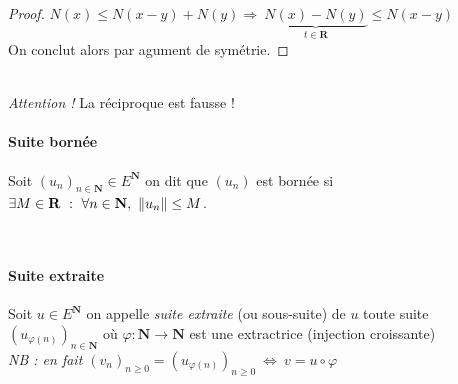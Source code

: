 		 \medskip \\


		\begin{proof}
			$N(x)\leq N(x-y) + N(y) \Rightarrow ~ \underbrace{N(x) - N(y)}_{t\in \mathbf{R}} \leq N(x-y)$\\
			On conclut alors par agument de symétrie.
		\end{proof} \medskip

			
		 \medskip \\ {\small \emph{Attention !} La réciproque est fausse !}

		\vspace{-15pt}
		\traitd
		\paragraph{Suite bornée}
			Soit $\left(u_n\right)_{n\in\mathbf{N}} \in E^{\mathbf{N}}$ on dit que $\left(u_n\right)$ est bornée si
			$\exists M \in \mathbf{R} ~:~ \forall n\in\mathbf{N} ,~\left\Vert u_n \right\Vert\leq M$. 
		\trait

		 \medskip \\

		
		\newpage
		
		\traitd
		\paragraph{Suite extraite}
			Soit $u \in E^{\mathbf{N}}$ on appelle \emph{suite extraite} (ou sous-suite) de $u$ toute suite
			$\left(u_{\varphi (n)}\right)_{n\in \mathbf{N}}$ où $\varphi : \mathbf{N} \rightarrow \mathbf{N}$ 
			est une extractrice (injection croissante) \\ \textit{\small NB : en fait $\left(v_n\right)_{n\geq0} = 
			\left(u_{\varphi (n)} \right)_{n\geq 0} ~\Leftrightarrow ~v= u\circ\varphi$} 
		\traitdouble

